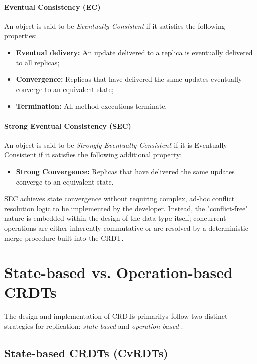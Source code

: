 \paragraph{Eventual Consistency (EC)} An object is said to be \textit{Eventually Consistent}
if it satisfies the following properties:
\begin{itemize}
    \item \textbf{Eventual delivery:} An update delivered to a replica is eventually delivered
        to all replicas; 
    \item \textbf{Convergence:} Replicas that have delivered the same updates eventually
        converge to an equivalent state; 
    \item \textbf{Termination:} All method executions terminate. 
\end{itemize}

\paragraph{Strong Eventual Consistency (SEC)} An object is said to be
\textit{Strongly Eventually Consistent} if it is Eventually Consistent if it satisfies the
following additional property:
\begin{itemize}
    \item \textbf{Strong Convergence:} Replicas that have delivered the same updates
        converge to an equivalent state.
\end{itemize}

SEC achieves state convergence without requiring complex, ad-hoc conflict resolution logic
to be implemented by the developer. Instead, the "conflict-free" nature is embedded within
the design of the data type itself; concurrent operations are either inherently commutative
or are resolved by a deterministic merge procedure built into the CRDT.

\section{State-based vs. Operation-based CRDTs}

The design and implementation of CRDTs primarilys follow two distinct strategies for
replication: \textit{state-based} and \textit{operation-based}
\cite{shapiro2011comprehensive}.

\subsection{State-based CRDTs (CvRDTs)}

